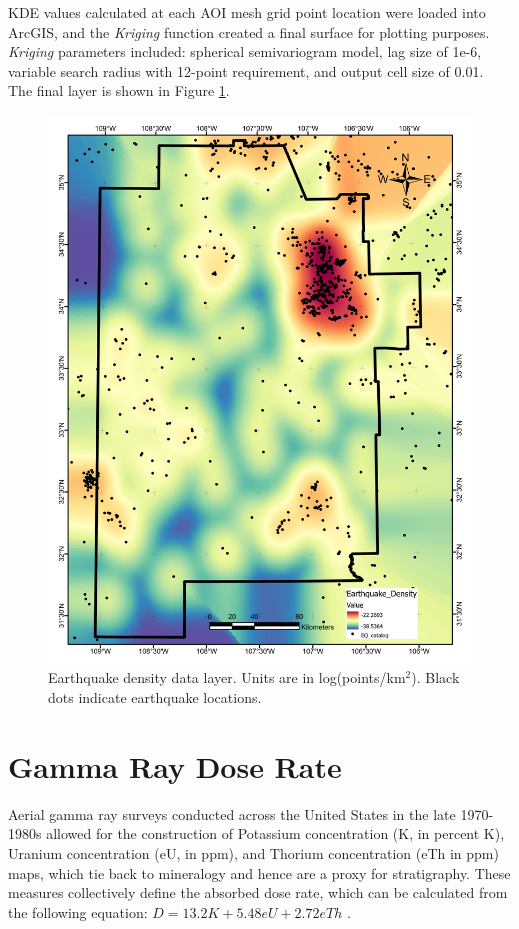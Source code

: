 KDE values calculated at each AOI mesh grid point location were loaded into ArcGIS, and the \textit{Kriging} function created a final surface for plotting purposes. \textit{Kriging} parameters included: spherical semivariogram model, lag size of 1e-6, variable search radius with 12-point requirement, and output cell size of 0.01. The final layer is shown in Figure \ref{fig:feat_EQ_density}.
\vfill
\pagebreak

\begin{figure}[H]
\centering
\includegraphics[width=0.75\linewidth]{templates/images/Figure-EarthquakeDensity.pdf}
\caption[Earthquake density data layer]{Earthquake density data layer. Units are in log(points/km$^2$). Black dots indicate earthquake locations.}
\label{fig:feat_EQ_density}
\end{figure}
\pagebreak

\section{Gamma Ray Dose Rate}\label{app:dl_gamma_dose}
Aerial gamma ray surveys conducted across the United States in the late 1970-1980s allowed for the construction of Potassium concentration (K, in percent K), Uranium concentration (eU, in ppm), and Thorium concentration (eTh in ppm) maps, which tie back to mineralogy and hence are a proxy for stratigraphy. These measures collectively define the absorbed dose rate, which can be calculated from the following equation: $D = 13.2 K + 5.48 eU + 2.72 eTh$ \citep{duval_terrestrial_2005}.


